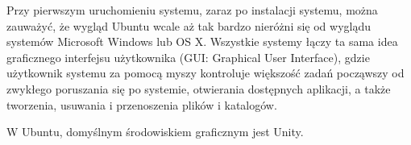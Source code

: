 Przy pierwszym uruchomieniu systemu, zaraz po instalacji systemu, można zauważyć, że wygląd Ubuntu wcale aż tak bardzo nieróżni się od wyglądu systemów Microsoft Windows lub OS X. Wszystkie systemy łączy ta sama idea graficznego interfejsu użytkownika (\textcolor{ubuntu_orange}{GUI: Graphical User Interface}), gdzie użytkownik systemu za pomocą myszy kontroluje większość zadań począwszy od zwykłego poruszania się po systemie, otwierania dostępnych aplikacji, a także tworzenia, usuwania i przenoszenia plików i katalogów.

W Ubuntu, domyślnym środowiskiem graficznym jest Unity.